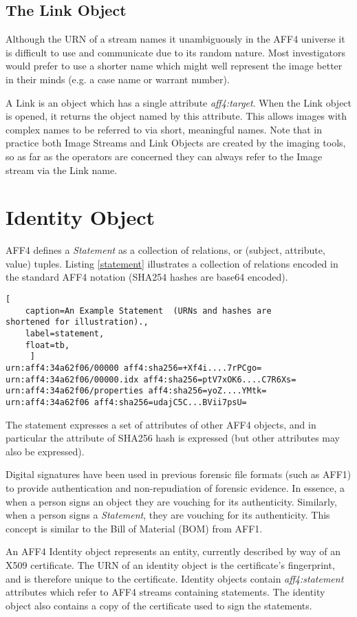 \documentclass[10pt, conference]{IEEEtran}
\begin{document}
\subsection{The Link Object}
Although the URN of a stream names it unambiguously in the AFF4
universe it is difficult to use and communicate due to its random
nature. Most investigators would prefer to use a shorter name which
might well represent the image better in their minds (e.g. a case
name or warrant number).

A Link is an object which has a single attribute
\emph{aff4:target}. When the Link object is opened, it returns the
object named by this attribute. This allows images with complex names
to be referred to via short, meaningful names. Note that in practice
both Image Streams and Link Objects are created by the imaging tools,
so as far as the operators are concerned they can always refer to the
Image stream via the Link name.

\section{Identity Object}
AFF4 defines a \emph{Statement} as a collection of relations, or
(subject, attribute, value) tuples. Listing \ref{statement}
illustrates a collection of relations encoded in the standard AFF4
notation (SHA254 hashes are base64 encoded).

\begin{lstlisting}[
	caption=An Example Statement  (URNs and hashes are
shortened for illustration).,
	label=statement,
	float=tb,
	 ]
urn:aff4:34a62f06/00000 aff4:sha256=+Xf4i....7rPCgo=
urn:aff4:34a62f06/00000.idx aff4:sha256=ptV7xOK6....C7R6Xs=
urn:aff4:34a62f06/properties aff4:sha256=yoZ....YMtk=
urn:aff4:34a62f06 aff4:sha256=udajC5C...BVii7psU=
\end{lstlisting}

The statement expresses a set of attributes of other AFF4 objects, and
in particular the attribute of SHA256 hash is expressed (but other
attributes may also be expressed).

Digital signatures have been used in previous forensic file formats
(such as AFF1) to provide authentication and non-repudiation of
forensic evidence. In essence, a when a person signs an object they
are vouching for its authenticity. Similarly, when a person signs a
\emph{Statement}, they are vouching for its authenticity. This concept
is similar to the Bill of Material (BOM) from AFF1.

An AFF4 Identity object represents an entity, currently described by
way of an X509 certificate. The URN of an identity object is the
certificate's fingerprint, and is therefore unique to the
certificate. Identity objects contain \emph{aff4:statement}
attributes which refer to AFF4 streams containing statements. The
identity object also contains a copy of the certificate used to sign
the statements.
\end{document}
